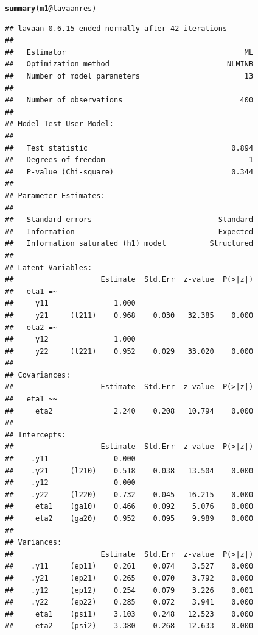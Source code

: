 \documentclass[10pt]{article}\usepackage[]{graphicx}\usepackage[]{xcolor}
\makeatletter
\newcommand{\hlopt}[1]{\textcolor[rgb]{0,0,0}{#1}}%
\newcommand{\hlstd}[1]{\textcolor[rgb]{0.345,0.345,0.345}{#1}}%
\newcommand{\hlkwc}[1]{\textcolor[rgb]{0.333,0.667,0.333}{#1}}%
\newcommand{\hlkwd}[1]{\textcolor[rgb]{0.737,0.353,0.396}{\textbf{#1}}}%
\newenvironment{kframe}{%
 \def\at@end@of@kframe{}%
 \ifinner\ifhmode%
  \def\at@end@of@kframe{\end{minipage}}%
  \begin{minipage}{\columnwidth}%
 \fi\fi%
 \def\FrameCommand##1{\hskip\@totalleftmargin \hskip-\fboxsep
 \colorbox{shadecolor}{##1}\hskip-\fboxsep
     \hskip-\linewidth \hskip-\@totalleftmargin \hskip\columnwidth}%
 \MakeFramed {\advance\hsize-\width
   \@totalleftmargin\z@ \linewidth\hsize
   \@setminipage}}%
 {\par\unskip\endMakeFramed%
 \at@end@of@kframe}
\newenvironment{knitrout}{}{} %
\makeatother
\begin{document}
\begin{knitrout}
\color{fgcolor}\begin{kframe}
\begin{alltt}
\hlkwd{summary}\hlstd{(m1}\hlopt{@}\hlkwc{lavaanres}\hlstd{)}
\end{alltt}
\begin{verbatim}
## lavaan 0.6.15 ended normally after 42 iterations
## 
##   Estimator                                         ML
##   Optimization method                           NLMINB
##   Number of model parameters                        13
## 
##   Number of observations                           400
## 
## Model Test User Model:
##                                                       
##   Test statistic                                 0.894
##   Degrees of freedom                                 1
##   P-value (Chi-square)                           0.344
## 
## Parameter Estimates:
## 
##   Standard errors                             Standard
##   Information                                 Expected
##   Information saturated (h1) model          Structured
## 
## Latent Variables:
##                    Estimate  Std.Err  z-value  P(>|z|)
##   eta1 =~                                             
##     y11               1.000                           
##     y21     (l211)    0.968    0.030   32.385    0.000
##   eta2 =~                                             
##     y12               1.000                           
##     y22     (l221)    0.952    0.029   33.020    0.000
## 
## Covariances:
##                    Estimate  Std.Err  z-value  P(>|z|)
##   eta1 ~~                                             
##     eta2              2.240    0.208   10.794    0.000
## 
## Intercepts:
##                    Estimate  Std.Err  z-value  P(>|z|)
##    .y11               0.000                           
##    .y21     (l210)    0.518    0.038   13.504    0.000
##    .y12               0.000                           
##    .y22     (l220)    0.732    0.045   16.215    0.000
##     eta1    (ga10)    0.466    0.092    5.076    0.000
##     eta2    (ga20)    0.952    0.095    9.989    0.000
## 
## Variances:
##                    Estimate  Std.Err  z-value  P(>|z|)
##    .y11     (ep11)    0.261    0.074    3.527    0.000
##    .y21     (ep21)    0.265    0.070    3.792    0.000
##    .y12     (ep12)    0.254    0.079    3.226    0.001
##    .y22     (ep22)    0.285    0.072    3.941    0.000
##     eta1    (psi1)    3.103    0.248   12.523    0.000
##     eta2    (psi2)    3.380    0.268   12.633    0.000

\end{verbatim}
\end{kframe}
\end{knitrout}
\end{document}
